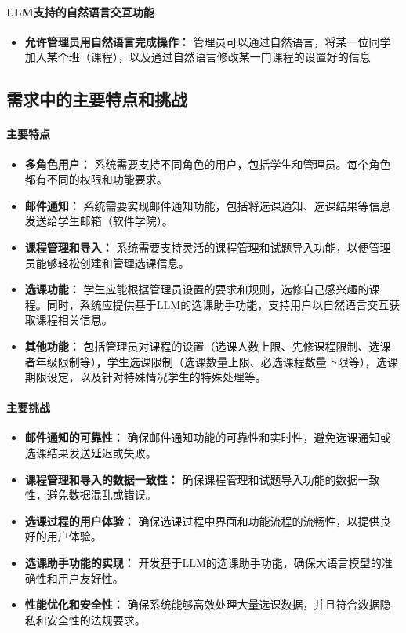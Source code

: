 \documentclass{article}
\begin{document}
\paragraph{LLM支持的自然语言交互功能}
\begin{itemize}
	\item \textbf{允许管理员用自然语言完成操作：} 管理员可以通过自然语言，将某一位同学加入某个班（课程），以及通过自然语言修改某一门课程的设置好的信息
\end{itemize}


\subsection{需求中的主要特点和挑战}
\paragraph{主要特点}
\begin{itemize}
	\item \textbf{多角色用户：} 系统需要支持不同角色的用户，包括学生和管理员。每个角色都有不同的权限和功能要求。
	\item \textbf{邮件通知：} 系统需要实现邮件通知功能，包括将选课通知、选课结果等信息发送给学生邮箱（软件学院）。
	\item \textbf{课程管理和导入：} 系统需要支持灵活的课程管理和试题导入功能，以便管理员能够轻松创建和管理选课信息。
	\item \textbf{选课功能：} 学生应能根据管理员设置的要求和规则，选修自己感兴趣的课程。同时，系统应提供基于LLM的选课助手功能，支持用户以自然语言交互获取课程相关信息。
	\item \textbf{其他功能：} 包括管理员对课程的设置（选课人数上限、先修课程限制、选课者年级限制等），学生选课限制（选课数量上限、必选课程数量下限等），选课期限设定，以及针对特殊情况学生的特殊处理等。
\end{itemize}

\paragraph{主要挑战}
\begin{itemize}
	\item \textbf{邮件通知的可靠性：}  确保邮件通知功能的可靠性和实时性，避免选课通知或选课结果发送延迟或失败。
	\item \textbf{课程管理和导入的数据一致性：} 确保课程管理和试题导入功能的数据一致性，避免数据混乱或错误。
	\item \textbf{选课过程的用户体验：} 确保选课过程中界面和功能流程的流畅性，以提供良好的用户体验。
	\item \textbf{选课助手功能的实现：} 开发基于LLM的选课助手功能，确保大语言模型的准确性和用户友好性。
	\item \textbf{性能优化和安全性：} 确保系统能够高效处理大量选课数据，并且符合数据隐私和安全性的法规要求。
\end{itemize}
\end{document}
